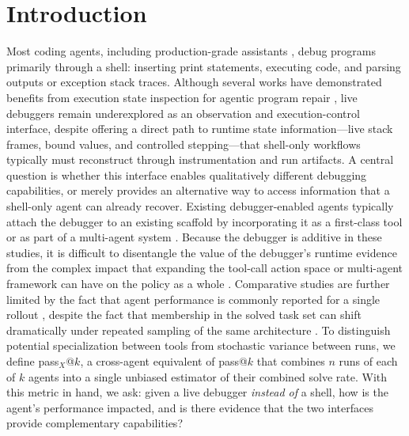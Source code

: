 \documentclass{article}
\begin{document}
\section{Introduction}
Most coding agents, including production-grade assistants \cite{anthropic_claudecode,openai_codex,github_copilot}, debug programs primarily through a shell: inserting print statements, executing code, and parsing outputs or exception stack traces. Although several works have demonstrated benefits from execution state inspection for agentic program repair \cite{zhong2024ldb, xiang2026adi, schuler2026tracegate}, live debuggers remain underexplored as an observation and execution-control interface, despite offering a direct path to runtime state information---live stack frames, bound values, and controlled stepping---that shell-only workflows typically must reconstruct through instrumentation and run artifacts. A central question is whether this interface enables qualitatively different debugging capabilities, or merely provides an alternative way to access information that a shell-only agent can already recover. Existing debugger-enabled agents typically attach the debugger to an existing scaffold by incorporating it as a first-class tool \citep{yuan2025debuggym, liu2025agenttd, liu2026swepdb} or as part of a multi-agent system \citep{wang2025inspectcoder, garg2026debug2fix, guo2026swedoctor}. Because the debugger is additive in these studies, it is difficult to disentangle the value of the debugger's runtime evidence from the complex impact that expanding the tool-call action space or multi-agent framework can have on the policy as a whole \citep{xu2026devil}. Comparative studies are further limited by the fact that agent performance is commonly reported for a single rollout \citep{zhang2024dei, wang2025inspectcoder, garg2026debug2fix}, despite the fact that membership in the solved task set can shift dramatically under repeated sampling of the same architecture \citep{mustahsan2025stochasticity, bjarnason2026randomness}. To distinguish potential specialization between tools from stochastic variance between runs, we define pass$_X$@$k$, a cross-agent equivalent of pass@$k$ that combines $n$ runs of each of $k$ agents into a single unbiased estimator of their combined solve rate. With this metric in hand, we ask: given a live debugger \emph{instead of} a shell, how is the agent's performance impacted, and is there evidence that the two interfaces provide complementary capabilities?
\end{document}
